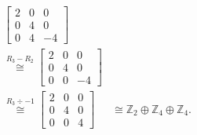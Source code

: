 \begin{align*}
\begin{bmatrix}
        	2 & 0 & 0 \\
        	0 & 4 & 0 \\
        	0 & 4 & -4
        	\end{bmatrix}& \\ \stackrel{R_3 - R_2}{\cong} 
        	\begin{bmatrix}
        	2 & 0 & 0 \\
        	0 & 4 & 0 \\
        	0 & 0 & -4 
        	\end{bmatrix}& \\ \stackrel{R_3\div-1}{\cong} 
        	\begin{bmatrix}
        	2 & 0 & 0 \\
        	0 & 4 & 0 \\
        	0 & 0 & 4
        	\end{bmatrix}& \cong \mathbb{Z}_2\oplus\mathbb{Z}_4\oplus\mathbb{Z}_4.
    	\end{align*}
